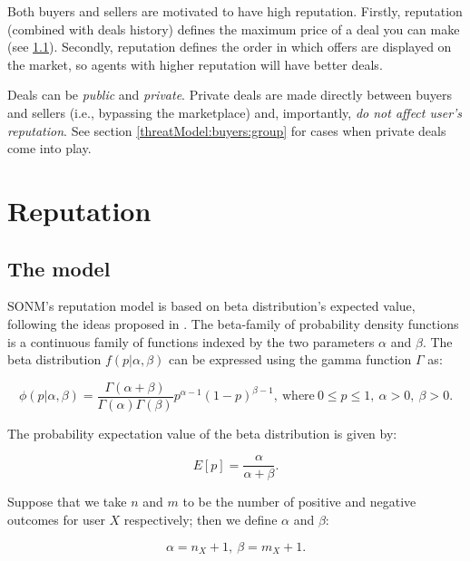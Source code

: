 \documentclass[11pt]{article}
\begin{document}
Both buyers and sellers are motivated to have high reputation. Firstly, reputation (combined with deals history) defines the maximum price of a deal you can make (see \ref{reputation:theModel}). Secondly, reputation defines the order in which offers are displayed on the market, so agents with higher reputation will have better deals.

Deals can be \textit{public} and \textit{private}. Private deals are made directly between buyers and sellers (i.e., bypassing the marketplace) and, importantly, \textit{do not affect user's reputation}. See section \ref{threatModel:buyers:group} for cases when private deals come into play.

\section{Reputation} \label{reputation}

\subsection{The model} \label{reputation:theModel}

SONM's reputation model is based on beta distribution's expected value, following the ideas proposed in \cite{josang2002beta}. The beta-family of probability density functions is a continuous family of functions indexed by the two parameters $ \alpha $ and $ \beta $. The beta distribution $ f(p | \alpha, \beta) $ can be expressed using the gamma function $ \Gamma $ as:

\begin{equation} \label{betaDistribution}
\phi(p | \alpha, \beta) = \frac{\Gamma(\alpha + \beta)}{\Gamma(\alpha) \Gamma(\beta)} p^{\alpha - 1} (1 - p)^{\beta - 1},\ \text{where}\ 0 \leq p \leq 1,\ \alpha > 0,\ \beta > 0.
\end{equation}

The probability expectation value of the beta distribution is given by:

\begin{equation} \label{expectation}
E[p] = \frac{\alpha}{\alpha + \beta}.
\end{equation}

Suppose that we take $ n $ and $ m $ to be the number of positive and negative outcomes for user $ X $ respectively; then we define $ \alpha $ and $ \beta $:

\begin{equation} \label{alphaBeta}
\alpha = n_{X} + 1,\ \beta = m_{X} + 1.
\end{equation}
\end{document}
